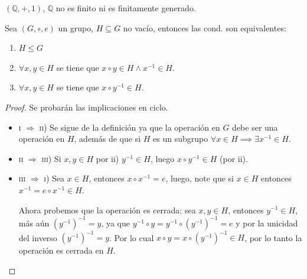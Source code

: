 \begin{eje}
	$(\mathbb{Q}, +, 1)$, $\mathbb{Q}$ no es finito ni es finitamente generado.
\end{eje}

\begin{prop}
	\label{prop:probar_subgrupo}
	Sea $(G, \circ, e)$ un grupo, $H \subseteq G$ no vacío, entonces las cond. son equivalentes:
	\begin{enumerate}[label=\roman*), font=\normalfont]
		\item $H \le G$
		\item $\forall x, y \in H$ se tiene que $x \circ y \in H \land x^{-1} \in H$.
		\item $\forall x, y \in H$ se tiene que $x \circ y^{-1} \in H$.
	\end{enumerate}
\end{prop}

\begin{proof} Se probarán las implicaciones en ciclo.\par
	\begin{itemize}
		\item \textsc{i} $\Rightarrow$ \textsc{ii}) Se sigue de la definición ya que la operación en $G$ debe ser una operación en $H$, además de que si $H$ es un subgrupo $\forall x \in H \implies \exists x^{-1} \in H$.

		\item \textsc{ii} $\Rightarrow$ \textsc{iii}) Si $x, y \in H$ por ii) $y^{-1} \in H$, luego $x \circ y^{-1} \in H$ (por ii).

		\item \textsc{iii} $\Rightarrow$ \textsc{i}) Sea $x \in H$, entonces $x \circ x^{-1} = e$, luego, note que si $x \in H$ entonces $x^{-1} = e \circ x^{-1} \in H$.\par
		      Ahora probemos que la operación es cerrada: sea $x, y \in H$, entonces $y^{-1} \in H$, más aún $(y^{-1})^{-1} = y$, ya que $y^{-1} \circ y = y^{-1} \circ (y^{-1})^{-1} = e$ y por la unicidad del inverso $(y^{-1})^{-1} = y$.
		      Por lo cual $x \circ y = x \circ (y^{-1})^{-1} \in H$, por lo tanto la operación es cerrada en $H$.
	\end{itemize}
\end{proof}



